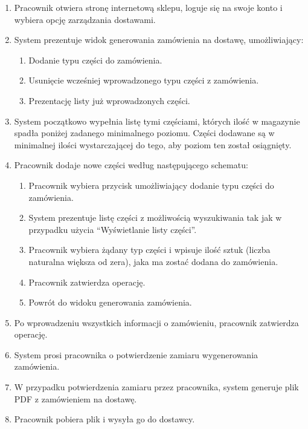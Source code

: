    \begin{enumerate}
    \item Pracownik otwiera stronę internetową sklepu, loguje się na swoje konto i wybiera opcję zarządzania dostawami.
    \item System prezentuje widok generowania zamówienia na dostawę, umożliwiający:
    \begin{enumerate}
      \item Dodanie typu części do zamówienia.
      \item Usunięcie wcześniej wprowadzonego typu części z zamówienia.
      \item Prezentację listy już wprowadzonych części.
    \end{enumerate}
    \item System początkowo wypełnia listę tymi częściami, których ilość w magazynie spadła poniżej zadanego minimalnego poziomu. Części dodawane są w minimalnej ilości wystarczającej do tego, aby poziom ten został osiągnięty.
    \item Pracownik dodaje nowe części według następującego schematu:
    \begin{enumerate}
      \item Pracownik wybiera przycisk umożliwiający dodanie typu części do zamówienia.
      \item System prezentuje listę części z możliwością wyszukiwania tak jak w przypadku użycia ``Wyświetlanie listy części''.
      \item Pracownik wybiera żądany typ części i wpisuje ilość sztuk (liczba naturalna większa od zera), jaka ma zostać dodana do zamówienia.
      \item Pracownik zatwierdza operację.
      \item Powrót do widoku generowania zamówienia.
    \end{enumerate}
    \item Po wprowadzeniu wszystkich informacji o zamówieniu, pracownik zatwierdza operację.
    \item System prosi pracownika o potwierdzenie zamiaru wygenerowania zamówienia.
    \item W przypadku potwierdzenia zamiaru przez pracownika, system generuje plik PDF z zamówieniem na dostawę.
    \item Pracownik pobiera plik i wysyła go do dostawcy.
  \end{enumerate}

